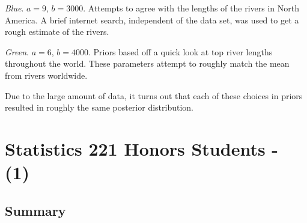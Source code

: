 \documentclass[12pt]{article}
\begin{document}
\noindent \textit{Blue}. $a=9$, $b=3000$.  Attempts to agree with the lengths of the rivers in North America.  A brief internet search, independent of the data set, was used to get a rough estimate of the rivers.

\noindent \textit{Green}. $a=6$, $b=4000$.  Priors based off a quick look at top river lengths throughout the world.  These parameters attempt to roughly match the mean from rivers worldwide.
\bigskip

\noindent Due to the large amount of data, it turns out that each of these choices in priors resulted in roughly the same posterior distribution.

%
%
%

\newpage

\section{Statistics 221 Honors Students - (1)}

\subsection{Summary}
\end{document}
